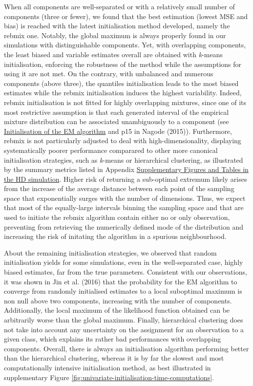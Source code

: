When all components are well-separated or with a relatively small number of components (three or fewer), we found that the best
estimation (lowest MSE and bias) is reached with the latest initialisation method developed, namely the rebmix one. Notably, the global maximum is always properly found in our simulations with distinguishable components. Yet, with overlapping components, the least biased and variable estimates overall are obtained with \emph{k}-means
initialisation, enforcing the robustness of the method while the
assumptions for using it are not met. On the contrary, with unbalanced and numerous components (above three), the quantiles initialisation leads to the most biased estimates while the rebmix initialisation induces the highest variability. Indeed, rebmix initialisation is not fitted for highly overlapping mixtures, since one of its most restrictive assumption is that each generated interval of the empirical mixture distribution can be associated unambiguously to a component (see \protect\hyperlink{initialisation-of-the-em-algorithm}{Initialisation of the EM algorithm} and p15 in Nagode (2015)). \color{green} Furthermore, rebmix is not particularly adjusted to deal with high-dimensionality, displaying systematically poorer performance comparared to other more canonical initialisation strategies, such as \emph{k}-means or hierarchical clustering, as illustrated by the summary metrics listed in Appendix \protect\hyperlink{supplementary-figures-and-tables-in-the-hd-simulation}{Supplementary Figures and Tables in the HD simulation}. Higher risk of returning a sub-optimal extremum likely arises from the increase of the average distance between each point of the sampling space that exponentially surges with the number of dimensions. Thus, we expect that most of the equally-large intervals binning the sampling space and that are used to initiate the rebmix algorithm contain either no or only observation, preventing from retrieving the numerically defined mode of the distribution and increasing the risk of initating the algorithm in a spurious neighbourhood. \color{black}

About the remaining initialisation strategies, we observed that random initialisation yields for some simulations, even in the well-separated case, highly biased estimates, far from the true
parameters. Consistent with our observations, it was shown in
Jin et al. (2016) that the probability for the EM algorithm to converge from
randomly initialised estimates to a local suboptimal maximum is non null above two
components, increasing with the number of components. Additionally, the
local maximum of the likelihood function obtained can be arbitrarily
worse than the global maximum. Finally, hierarchical clustering does not
take into account any uncertainty on the assignment for an observation
to a given class, which explains its rather bad performances with
overlapping components. Overall, there is always an initialisation
algorithm performing better than the hierarchical clustering, whereas it
is by far the slowest and most computationally intensive initialisation
method, as best illustrated in supplementary Figure \ref{fig:univariate-initialisation-time-computations}.

